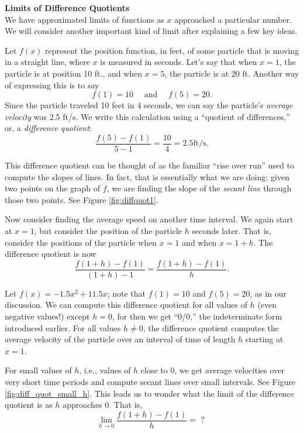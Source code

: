 \noindent\textbf{\large Limits of Difference Quotients}\\

We have approximated limits of functions as $x$ approached a particular number. We will consider another important kind of limit after explaining a few key ideas.


Let $f(x)$ represent the position function, in feet, of some particle that is moving in a straight line, where $x$ is measured in seconds. Let's say that when $x=1$, the particle is at position 10 ft., and when $x=5$, the particle is at 20 ft. Another way of expressing this is to say 
\[
f(1)=10 \quad \text{ and } \quad f(5) = 20.
\]
Since the particle traveled 10 feet in 4 seconds, we can say the particle's \textit{average velocity} was 2.5 ft/s. We write this calculation using a ``quotient of differences,'' or, a \textit{difference quotient}: 
\[
\frac{f(5) - f(1)}{5-1} = \frac{10}4 = 2.5 \text{ft/s}.
\]

This difference quotient can be thought of as the familiar ``rise over run'' used to compute the slopes of lines. In fact, that is essentially what we are doing: given two points on the graph of $f$, we are finding the slope of the \textit{secant line} through those two points. See Figure \ref{fig:diffquot1}.

Now consider finding the average speed on another time interval. We again start at $x=1$, but consider the position of the particle $h$ seconds later. That is, consider the positions of the particle when $x=1$ and when $x=1+h$. The difference quotient is now 
\[
\frac{f(1+h)-f(1)}{(1+h)-1} = \frac{f(1+h)-f(1)}h.
\]

Let $f(x) = -1.5x^2+11.5x$; note that $f(1)=10$ and $f(5) = 20$, as in our discussion. We can compute this difference quotient for all values of $h$ (even negative values!) except $h=0$, for then we get ``0/0,'' the indeterminate form introduced earlier. For all values $h\neq 0$, the difference quotient computes the average velocity of the particle over an interval of time of length $h$ starting at $x=1$. 

For small values of $h$, i.e., values of $h$ close to 0, we get average velocities over very short time periods and compute secant lines over small intervals. See Figure \ref{fig:diff_quot_small_h}. This leads us to wonder what the limit of the difference quotient is as $h$ approaches 0. That is, 
\[
\lim_{h\to 0} \frac{f(1+h)-f(1)}{h} = \text{ ? }
\]

